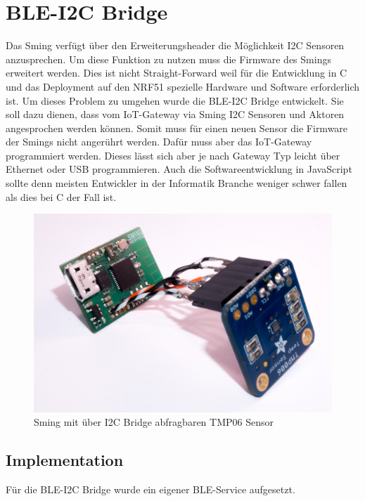 \chapter{BLE-I2C Bridge}
\label{bleI2cBridge}

Das Sming verfügt über den Erweiterungsheader die Möglichkeit I2C Sensoren anzusprechen. Um diese Funktion zu nutzen muss die Firmware des Smings erweitert werden. Dies ist nicht Straight-Forward weil für die Entwicklung in C und das Deployment auf den NRF51 spezielle Hardware und Software erforderlich ist. Um dieses Problem zu umgehen wurde die BLE-I2C Bridge entwickelt. Sie soll dazu dienen, dass vom IoT-Gateway via Sming I2C Sensoren und Aktoren angesprochen werden können. Somit muss für einen neuen Sensor die Firmware der Smings nicht angerührt werden. Dafür muss aber das IoT-Gateway programmiert werden. Dieses lässt sich aber je nach Gateway Typ leicht über Ethernet oder USB programmieren. Auch die Softwareentwicklung in JavaScript sollte denn meisten Entwickler in der Informatik Branche weniger schwer fallen als dies bei C der Fall ist.

\begin{figure}[hbtp]
    \center
    \includegraphics[width=\textwidth]{bilder/foto-2.jpg}
    \caption{Sming mit über I2C Bridge abfragbaren TMP06 Sensor}
    \label{fig:sming_mit_tmp06}
\end{figure}


\section{Implementation}
\label{bleI2cImplementation}

Für die BLE-I2C Bridge wurde ein eigener BLE-Service aufgesetzt.

